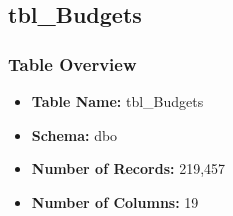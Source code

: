 \begin{landscape}
\subsection{tbl\_Budgets}

\subsubsection{Table Overview}
\begin{itemize}
\item \textbf{Table Name:} tbl\_Budgets
\item \textbf{Schema:} dbo
\item \textbf{Number of Records:} 219,457
\item \textbf{Number of Columns:} 19
\end{itemize}


\end{landscape}
